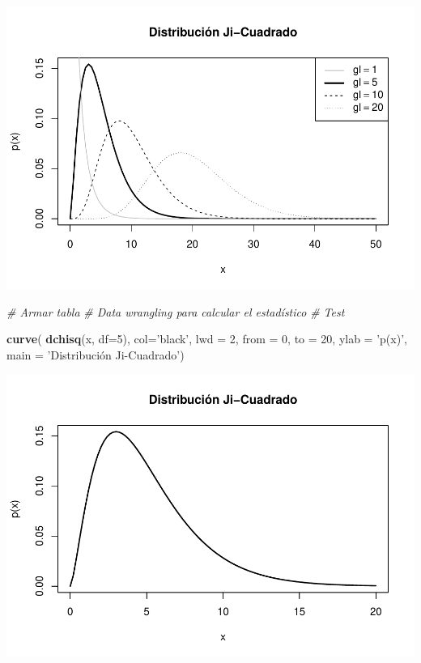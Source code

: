 \documentclass[]{article}
\newenvironment{Shaded}{\begin{snugshade}}{\end{snugshade}}
\newcommand{\CommentTok}[1]{\textcolor[rgb]{0.56,0.35,0.01}{\textit{#1}}}
\newcommand{\DataTypeTok}[1]{\textcolor[rgb]{0.13,0.29,0.53}{#1}}
\newcommand{\DecValTok}[1]{\textcolor[rgb]{0.00,0.00,0.81}{#1}}
\newcommand{\KeywordTok}[1]{\textcolor[rgb]{0.13,0.29,0.53}{\textbf{#1}}}
\newcommand{\NormalTok}[1]{#1}
\newcommand{\StringTok}[1]{\textcolor[rgb]{0.31,0.60,0.02}{#1}}
\begin{document}
\includegraphics{NotaDeClaseLong_files/figure-latex/unnamed-chunk-18-1.pdf}

\begin{Shaded}
\begin{Highlighting}[]
\CommentTok{# Armar tabla}
\CommentTok{# Data wrangling para calcular el estadístico}
\CommentTok{# Test}

\KeywordTok{curve}\NormalTok{( }\KeywordTok{dchisq}\NormalTok{(x, }\DataTypeTok{df=}\DecValTok{5}\NormalTok{), }\DataTypeTok{col=}\StringTok{'black'}\NormalTok{, }\DataTypeTok{lwd =} \DecValTok{2}\NormalTok{,}
       \DataTypeTok{from =} \DecValTok{0}\NormalTok{, }\DataTypeTok{to =} \DecValTok{20}\NormalTok{,}
       \DataTypeTok{ylab =} \StringTok{'p(x)'}\NormalTok{,}
       \DataTypeTok{main =} \StringTok{'Distribución Ji-Cuadrado'}\NormalTok{)}
\end{Highlighting}
\end{Shaded}

\includegraphics{NotaDeClaseLong_files/figure-latex/unnamed-chunk-18-2.pdf}
\end{document}
